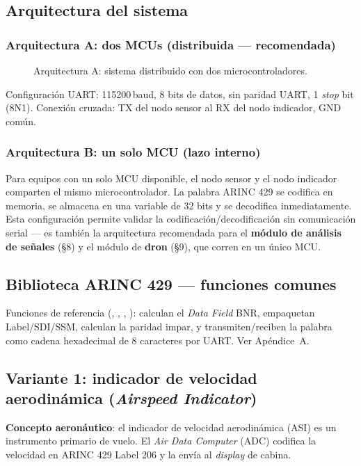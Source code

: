 \documentclass[11pt]{article}
\begin{document}
\subsection{Arquitectura del sistema}
\subsubsection{Arquitectura A: dos MCUs (distribuida — recomendada)}
\begin{figure}[H]\centering
{}
\caption{Arquitectura A: sistema distribuido con dos microcontroladores.}
\end{figure}
Configuración UART: 115200\,baud, 8 bits de datos, sin paridad UART, 1 \emph{stop} bit
(8N1). Conexión cruzada: TX del nodo sensor al RX del nodo indicador, GND común.

\subsubsection{Arquitectura B: un solo MCU (lazo interno)}
Para equipos con un solo MCU disponible, el nodo sensor y el nodo indicador comparten el
mismo microcontrolador. La palabra ARINC 429 se codifica en memoria, se almacena en una
variable de 32 bits y se decodifica inmediatamente. Esta configuración permite validar
la codificación/decodificación sin comunicación serial — es también la arquitectura
recomendada para el \textbf{módulo de análisis de señales} (\S8) y el módulo de
\textbf{dron} (\S9), que corren en un único MCU.

\subsection{Biblioteca ARINC 429 — funciones comunes}
Funciones de referencia (, ,
, ): calculan el \emph{Data
Field} BNR, empaquetan Label/SDI/SSM, calculan la paridad impar, y transmiten/reciben la
palabra como cadena hexadecimal de 8 caracteres por UART. Ver Apéndice~A.

\subsection{Variante 1: indicador de velocidad aerodinámica (\emph{Airspeed Indicator})}
\textbf{Concepto aeronáutico}: el indicador de velocidad aerodinámica (ASI) es un
instrumento primario de vuelo. El \emph{Air Data Computer} (ADC) codifica la velocidad en
ARINC 429 Label 206 y la envía al \emph{display} de cabina.
\end{document}
